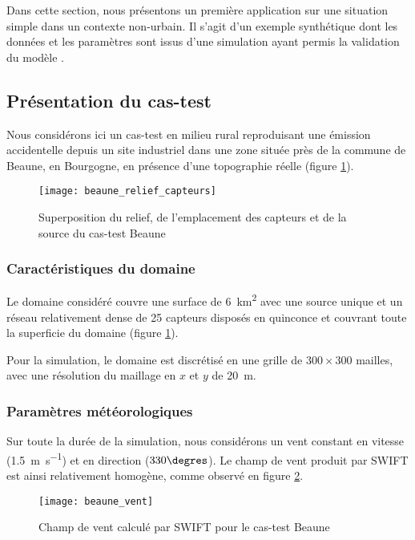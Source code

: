 Dans cette section, nous présentons un première application sur une situation  simple dans un contexte non-urbain. Il s'agit d'un exemple synthétique dont les données et les paramètres sont issus d'une simulation ayant permis la validation du modèle .

\subsection{Présentation du cas-test}

Nous considérons ici un cas-test en milieu rural reproduisant une émission accidentelle depuis un site industriel dans une zone située près de la commune de Beaune, en Bourgogne, en présence d'une topographie réelle  (figure \ref{fig_beaune_relief}). 

\begin{figure}[h!]
	\centering
	\texttt{[image: beaune\_relief\_capteurs]}
	\caption{Superposition du relief, de l'emplacement des capteurs et de la source du cas-test Beaune}
	\label{fig_beaune_relief}
\end{figure}

\subsubsection{Caractéristiques du domaine}
Le domaine considéré couvre une surface de \SI{6}{\square\kilo\meter} avec une source unique et un réseau relativement dense de 25 capteurs disposés en quinconce et couvrant toute la superficie du domaine (figure \ref{fig_beaune_relief}).

Pour la simulation, le domaine est discrétisé en une grille de $300 \times 300$ mailles, avec une résolution du maillage en $x$ et $y$ de \SI{20}{\meter}.

\subsubsection{Paramètres météorologiques}
Sur toute la durée de la simulation, nous considérons un vent constant en vitesse (\SI{1.5}{\m\per\second}) et en direction ($330\degres$). Le champ de vent produit par SWIFT est ainsi relativement homogène, comme observé en figure \ref{fig_beaune_vent}.

\begin{figure}[h!]
	\centering
	\texttt{[image: beaune\_vent]}
	\caption{Champ de vent calculé par SWIFT pour le cas-test Beaune}
	\label{fig_beaune_vent}
\end{figure}


